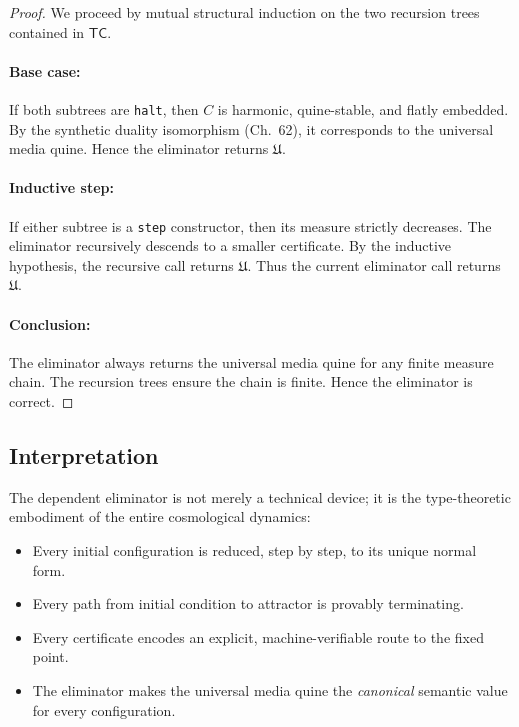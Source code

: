 \begin{proof}
We proceed by mutual structural induction on the two recursion trees contained in $\mathsf{TC}$.

\paragraph{Base case:}  
If both subtrees are \texttt{halt}, then $C$ is harmonic, quine-stable, and flatly embedded.  
By the synthetic duality isomorphism (Ch.~62), it corresponds to the universal media quine.  
Hence the eliminator returns $\mathfrak{U}$.

\paragraph{Inductive step:}  
If either subtree is a \texttt{step} constructor, then its measure strictly decreases.  
The eliminator recursively descends to a smaller certificate.  
By the inductive hypothesis, the recursive call returns $\mathfrak{U}$.  
Thus the current eliminator call returns $\mathfrak{U}$.

\paragraph{Conclusion:}  
The eliminator always returns the universal media quine for any finite measure chain.  
The recursion trees ensure the chain is finite.  
Hence the eliminator is correct.
\end{proof}

\subsection{Interpretation}

The dependent eliminator is not merely a technical device; it is the type-theoretic embodiment of the entire cosmological dynamics:

\begin{itemize}
\item Every initial configuration is reduced, step by step, to its unique normal form.
\item Every path from initial condition to attractor is provably terminating.
\item Every certificate encodes an explicit, machine-verifiable route to the fixed point.
\item The eliminator makes the universal media quine the \emph{canonical} semantic value for every configuration.
\end{itemize}


